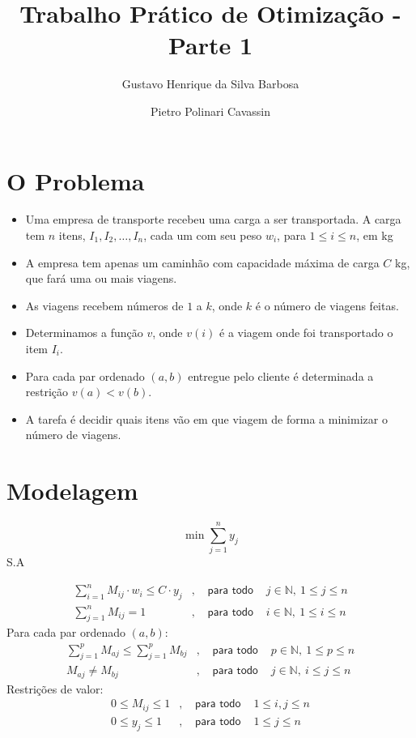 \documentclass{article}
\title{Trabalho Prático de Otimização - Parte 1}
\author{
    Gustavo Henrique da Silva Barbosa
    \and
    Pietro Polinari Cavassin
}
\begin{document}
\maketitle

\section{O Problema}
\begin{itemize}
\item Uma empresa de transporte recebeu uma carga a ser transportada.
A carga tem $n$ itens, $I_1, I_2, \dots, I_n$, cada um com seu peso 
$w_i$, para $1 \le i \le n$, em kg

\item A empresa tem apenas um caminhão com capacidade máxima de carga $C$ kg,
que fará uma ou mais viagens.

\item As viagens recebem números de $1$ a $k$, onde $k$ é o número de viagens
feitas.

\item Determinamos a função $v$, onde $v(i)$ é a viagem onde foi transportado
o item $I_i$. 

\item Para cada par ordenado $(a, b)$ entregue pelo cliente é determinada a
restrição $v(a) < v(b)$.

\item A tarefa é decidir quais itens vão em que viagem de forma a minimizar
o número de viagens.
\end{itemize}

\newpage
\section{Modelagem}

$$\min \sum_{j=1}^n y_j$$
S.A 

\begin{align}
\sum_{i=1}^n M_{ij} \cdot w_i \le C \cdot y_j&, & 
    \textsf{ para todo }& j \in \mathbb{N},\ 1 \le j \le n\\
\sum_{j=1}^n M_{ij} = 1&,             & 
    \textsf{ para todo }& i \in \mathbb{N},\ 1 \le i \le n
\end{align}
Para cada par ordenado $(a,b)$:
\begin{align}
\sum_{j=1}^p M_{aj} \le \sum_{j=1}^p M_{bj}&, & 
    \textsf{ para todo }& p \in \mathbb{N},\ 1 \le p \le n\\
M_{aj} \not = M_{bj}&, &
    \textsf{ para todo }& j \in \mathbb{N},\ i \le j \le n
\end{align}
Restrições de valor:
\begin{align}
0 \le M_{ij}\le 1&, &
    \textsf{ para todo }& 1 \le i,j \le n\\
0 \le y_{j}\le 1&, &
    \textsf{ para todo }& 1 \le j \le n
\end{align}
\end{document}
